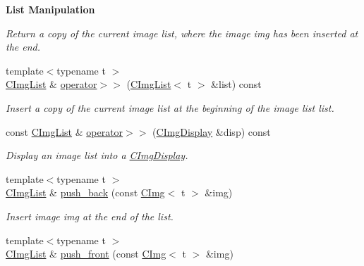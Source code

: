 \begin{Indent}{\bf List Manipulation}
\begin{DoxyCompactItemize}
\begin{DoxyCompactList}\small\item\em Return a copy of the current image list, where the image {\ttfamily img} has been inserted at the end. \end{DoxyCompactList}\item 
\hypertarget{structcimg__library_1_1_c_img_list_a02020fa6b5735d5f3b90aebb7496cb60}{{\footnotesize template$<$typename t $>$ }\\\hyperlink{structcimg__library_1_1_c_img_list}{C\-Img\-List} \& \hyperlink{structcimg__library_1_1_c_img_list_a02020fa6b5735d5f3b90aebb7496cb60}{operator$>$$>$} (\hyperlink{structcimg__library_1_1_c_img_list}{C\-Img\-List}$<$ t $>$ \&list) const }\label{structcimg__library_1_1_c_img_list_a02020fa6b5735d5f3b90aebb7496cb60}

\begin{DoxyCompactList}\small\item\em Insert a copy of the current image list at the beginning of the image list {\ttfamily list}. \end{DoxyCompactList}\item 
\hypertarget{structcimg__library_1_1_c_img_list_a428f8d86ccdcd08fa2475533b9d4b909}{const \hyperlink{structcimg__library_1_1_c_img_list}{C\-Img\-List} \& \hyperlink{structcimg__library_1_1_c_img_list_a428f8d86ccdcd08fa2475533b9d4b909}{operator$>$$>$} (\hyperlink{structcimg__library_1_1_c_img_display}{C\-Img\-Display} \&disp) const }\label{structcimg__library_1_1_c_img_list_a428f8d86ccdcd08fa2475533b9d4b909}

\begin{DoxyCompactList}\small\item\em Display an image list into a \hyperlink{structcimg__library_1_1_c_img_display}{C\-Img\-Display}. \end{DoxyCompactList}\item 
\hypertarget{structcimg__library_1_1_c_img_list_ad8262ef4e1abe33f4ab9b705ea9f8ec4}{{\footnotesize template$<$typename t $>$ }\\\hyperlink{structcimg__library_1_1_c_img_list}{C\-Img\-List} \& \hyperlink{structcimg__library_1_1_c_img_list_ad8262ef4e1abe33f4ab9b705ea9f8ec4}{push\-\_\-back} (const \hyperlink{structcimg__library_1_1_c_img}{C\-Img}$<$ t $>$ \&img)}\label{structcimg__library_1_1_c_img_list_ad8262ef4e1abe33f4ab9b705ea9f8ec4}

\begin{DoxyCompactList}\small\item\em Insert image {\ttfamily img} at the end of the list. \end{DoxyCompactList}\item 
\hypertarget{structcimg__library_1_1_c_img_list_a3b46c26342d163eb82622eac25aa429b}{{\footnotesize template$<$typename t $>$ }\\\hyperlink{structcimg__library_1_1_c_img_list}{C\-Img\-List} \& \hyperlink{structcimg__library_1_1_c_img_list_a3b46c26342d163eb82622eac25aa429b}{push\-\_\-front} (const \hyperlink{structcimg__library_1_1_c_img}{C\-Img}$<$ t $>$ \&img)}\label{structcimg__library_1_1_c_img_list_a3b46c26342d163eb82622eac25aa429b}


\end{DoxyCompactItemize}
\end{Indent}
